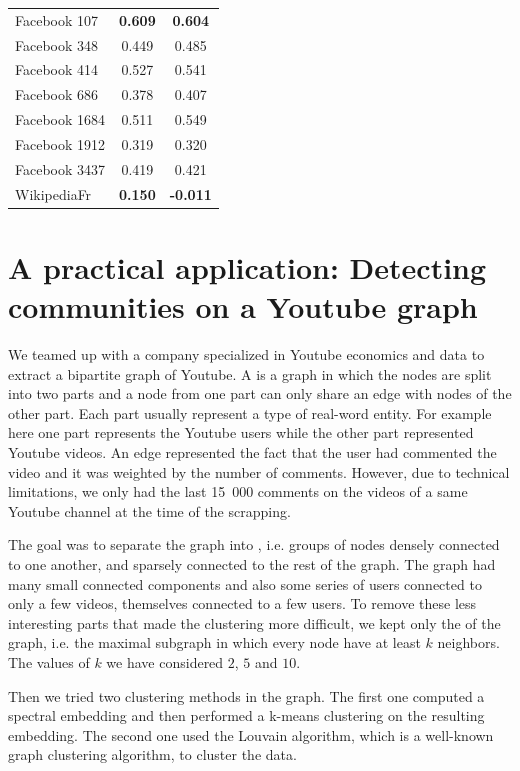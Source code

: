 \begin{table}[t]
\begin{center}
\begin{tabular}{l|c|c}
Facebook 107 & \textbf{0.609} & \textbf{0.604}\\
Facebook 348 & 0.449 & 0.485\\
Facebook 414 & 0.527 & 0.541\\
Facebook 686 & 0.378 & 0.407\\
Facebook 1684 & 0.511 & 0.549\\
Facebook 1912 & 0.319 & 0.320\\
Facebook 3437 & 0.419 & 0.421\\
WikipediaFr  & \textbf{0.150} & \textbf{-0.011}\\
\hline
\end{tabular}
\end{center}
\label{tab:CISIP_SVD_scores}
\end{table}

\section{A practical application: Detecting communities on a Youtube graph}
We teamed up with a company specialized in Youtube economics and data to extract a bipartite graph of Youtube. A  is a graph in which the nodes are split into two parts and a node from one part can only share an edge with nodes of the other part. Each part usually represent a type of real-word entity. For example here one part represents the Youtube users while the other part represented Youtube videos. An edge represented the fact that the user had commented the video and it was weighted by the number of comments. However, due to technical limitations, we only had the last 15~000 comments on the videos of a same Youtube channel at the time of the scrapping.

The goal was to separate the graph into , i.e. groups of nodes densely connected to one another, and sparsely connected to the rest of the graph. The graph had many small connected components and also some series of users connected to only a few videos, themselves connected to a few users. To remove these less interesting parts that made the clustering more difficult, we kept only the  of the graph, i.e. the maximal subgraph in which every node have at least $k$ neighbors. The values of $k$ we have considered $2$, $5$ and $10$. 

Then we tried two clustering methods in the graph. The first one computed a spectral embedding and then performed a k-means clustering on the resulting embedding. The second one used the Louvain algorithm, which is a well-known graph clustering algorithm, to cluster the data.

